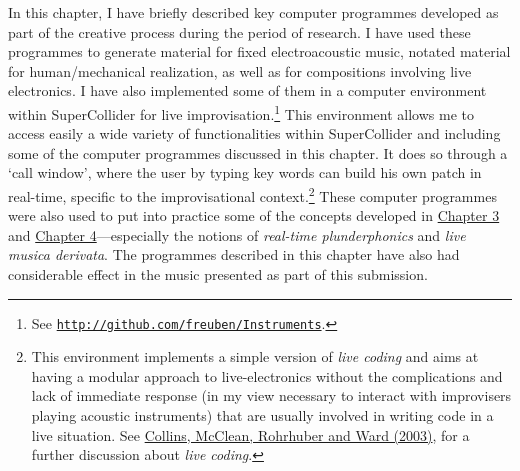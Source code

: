 In this chapter, I have briefly described key computer programmes developed as part of the creative process during the period of research. I have used these programmes to generate material for fixed electroacoustic music, notated material for human/mechanical realization, as well as for compositions involving live electronics. I have also implemented some of them in a computer environment within SuperCollider for live improvisation.\footnote{See \href{http://github.com/freuben/Instruments}{\texttt{http://github.com/freuben/Instruments}}.} This environment allows me to access easily a wide variety of functionalities within SuperCollider and including some of the computer programmes discussed in this chapter. It does so through a `call window', where the user by typing key words can build his own patch in real-time, specific to the improvisational context.\footnote{This environment implements a simple version of \emph{live coding} and aims at having a modular approach to live-electronics without the complications and lack of immediate response (in my view necessary to interact with improvisers playing acoustic instruments) that are usually involved in writing code in a live situation. See \hyperlink{livecoding}{Collins, McClean, Rohrhuber and Ward (2003)}, for a further discussion about \emph{live coding}.} These computer programmes were also used to put into practice some of the concepts developed in \hyperlink{chapter3}{Chapter 3} and \hyperlink{chapter4}{Chapter 4}---especially the notions of \emph{real-time plunderphonics} and \emph{live musica derivata}. The programmes described in this chapter have also had considerable effect in the music presented as part of this submission.

\label{ch:compapp}